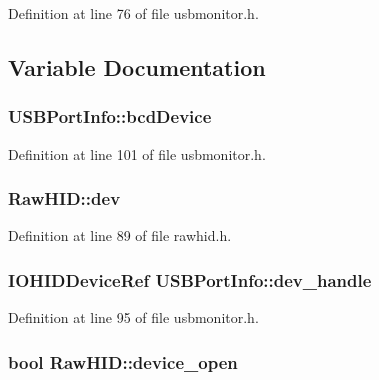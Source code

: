 Definition at line 76 of file usbmonitor.\-h.



\subsection{Variable Documentation}
\hypertarget{group___raw_h_i_d_plugin_ga546927dd722c593c7acfca1cb045494d}{
\subsubsection[{bcd\-Device}]{ U\-S\-B\-Port\-Info\-::bcd\-Device}}\label{group___raw_h_i_d_plugin_ga546927dd722c593c7acfca1cb045494d}


Definition at line 101 of file usbmonitor.\-h.

\hypertarget{group___raw_h_i_d_plugin_ga4939588bf5bf31e39139a75ca4319884}{
\subsubsection[{dev}]{ Raw\-H\-I\-D\-::dev\hspace{0.3cm}{\ttfamily [protected]}}}\label{group___raw_h_i_d_plugin_ga4939588bf5bf31e39139a75ca4319884}


Definition at line 89 of file rawhid.\-h.

\hypertarget{group___raw_h_i_d_plugin_gaa788f428f81fe24d5fd83a27fc3761c2}{
\subsubsection[{dev\-\_\-handle}]{\setlength{\rightskip}{0pt plus 5cm}I\-O\-H\-I\-D\-Device\-Ref U\-S\-B\-Port\-Info\-::dev\-\_\-handle}}\label{group___raw_h_i_d_plugin_gaa788f428f81fe24d5fd83a27fc3761c2}


Definition at line 95 of file usbmonitor.\-h.

\hypertarget{group___raw_h_i_d_plugin_ga6ec3ad7c063679816e5aafed60f677c3}{
\subsubsection[{device\-\_\-open}]{\setlength{\rightskip}{0pt plus 5cm}bool Raw\-H\-I\-D\-::device\-\_\-open\hspace{0.3cm}{\ttfamily [protected]}}}\label{group___raw_h_i_d_plugin_ga6ec3ad7c063679816e5aafed60f677c3}


